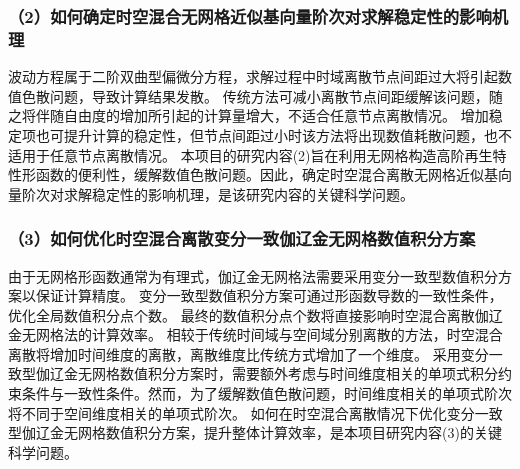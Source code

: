\subsubsection*{\bfseries （2）如何确定时空混合无网格近似基向量阶次对求解稳定性的影响机理}
波动方程属于二阶双曲型偏微分方程，求解过程中时域离散节点间距过大将引起数值色散问题，导致计算结果发散。
传统方法可减小离散节点间距缓解该问题，随之将伴随自由度的增加所引起的计算量增大，不适合任意节点离散情况。
增加稳定项也可提升计算的稳定性，但节点间距过小时该方法将出现数值耗散问题，也不适用于任意节点离散情况。
本项目的研究内容(2)旨在利用无网格构造高阶再生特性形函数的便利性，缓解数值色散问题。因此，确定时空混合离散无网格近似基向量阶次对求解稳定性的影响机理，是该研究内容的关键科学问题。

\subsubsection*{\bfseries （3）如何优化时空混合离散变分一致伽辽金无网格数值积分方案}
由于无网格形函数通常为有理式，伽辽金无网格法需要采用变分一致型数值积分方案以保证计算精度。
变分一致型数值积分方案可通过形函数导数的一致性条件，优化全局数值积分点个数。
最终的数值积分点个数将直接影响时空混合离散伽辽金无网格法的计算效率。
相较于传统时间域与空间域分别离散的方法，时空混合离散将增加时间维度的离散，离散维度比传统方式增加了一个维度。
采用变分一致型伽辽金无网格数值积分方案时，需要额外考虑与时间维度相关的单项式积分约束条件与一致性条件。然而，为了缓解数值色散问题，时间维度相关的单项式阶次将不同于空间维度相关的单项式阶次。
如何在时空混合离散情况下优化变分一致型伽辽金无网格数值积分方案，提升整体计算效率，是本项目研究内容(3)的关键科学问题。

\newpage